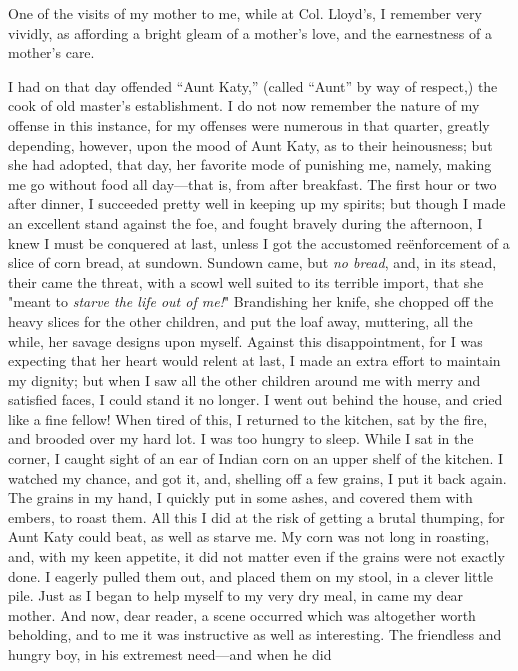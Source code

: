 One of the visits of my mother to me, while at Col. Lloyd's, I remember
very vividly, as affording a bright gleam of a mother's love, and the
earnestness of a mother's care.

I had on that day offended ``Aunt Katy,'' (called ``Aunt'' by way of
respect,) the cook of old master's establishment. I do not now remember
the nature of my offense in this instance, for my offenses were
{\protect\hypertarget{55}{}{}}numerous in that quarter, greatly
depending, however, upon the mood of Aunt Katy, as to their heinousness;
but she had adopted, that day, her favorite mode of punishing me,
namely, making me go without food all day---that is, from after
breakfast. The first hour or two after dinner, I succeeded pretty well
in keeping up my spirits; but though I made an excellent stand against
the foe, and fought bravely during the afternoon, I knew I must be
conquered at last, unless I got the accustomed reënforcement of a slice
of corn bread, at sundown. Sundown came, but \emph{no bread}, and, in
its stead, their came the threat, with a scowl well suited to its
terrible import, that she "meant to \emph{starve the life out of me!}"
Brandishing her knife, she chopped off the heavy slices for the other
children, and put the loaf away, muttering, all the while, her savage
designs upon myself. Against this disappointment, for I was expecting
that her heart would relent at last, I made an extra effort to maintain
my dignity; but when I saw all the other children around me with merry
and satisfied faces, I could stand it no longer. I went out behind the
house, and cried like a fine fellow! When tired of this, I returned to
the kitchen, sat by the fire, and brooded over my hard lot. I was too
hungry to sleep. While I sat in the corner, I caught sight of an ear of
Indian corn on an upper shelf of the kitchen. I watched my chance, and
got it, and, shelling off a few grains, I put it back again. The grains
in my hand, I quickly put in some ashes, and covered them with embers,
to roast them. All this I did at the risk of getting a brutal thumping,
for Aunt Katy could beat, as well as starve me. My corn was not long in
{\protect\hypertarget{56}{}{}}roasting, and, with my keen appetite, it
did not matter even if the grains were not exactly done. I eagerly
pulled them out, and placed them on my stool, in a clever little pile.
Just as I began to help myself to my very dry meal, in came my dear
mother. And now, dear reader, a scene occurred which was altogether
worth beholding, and to me it was instructive as well as interesting.
The friendless and hungry boy, in his extremest need---and when he did
